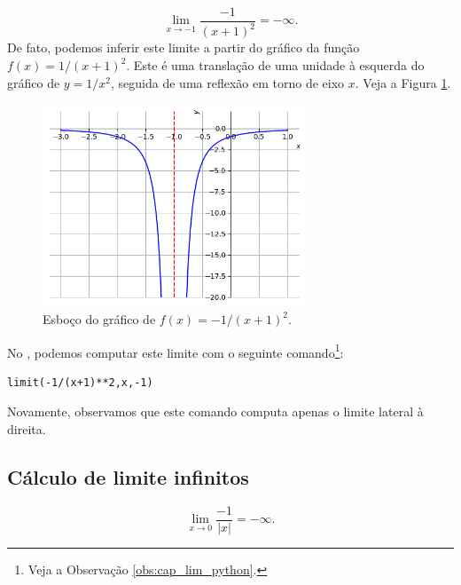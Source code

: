 \begin{ex}
  \begin{equation}
    \lim_{x\to -1} \frac{-1}{(x+1)^2} = -\infty.
  \end{equation}
  De fato, podemos inferir este limite a partir do gráfico da função $f(x) = 1/(x+1)^2$. Este é uma translação de uma unidade à esquerda do gráfico de $y = 1/x^2$, seguida de uma reflexão em torno de eixo $x$. Veja a Figura \ref{fig:ex_liminf-1x2}.

  \begin{figure}[H]
    \centering
    \includegraphics[width=0.7\textwidth]{./cap_lim/dados/fig_ex_liminf-1x2/fig_ex_liminf-1x2}
    \caption{Esboço do gráfico de $f(x)=-1/(x+1)^2$.}
    \label{fig:ex_liminf-1x2}
  \end{figure}

  \ifispython
  No \sympy, podemos computar este limite com o seguinte comando\footnote{Veja a Observação \ref{obs:cap_lim_python}.}:
\begin{verbatim}
limit(-1/(x+1)**2,x,-1)
\end{verbatim}
  Novamente, observamos que este comando computa apenas o limite lateral à direita.
  \fi
\end{ex}

\subsection{Cálculo de limite infinitos}

\emconstrucao

\begin{ex}
  \begin{equation}
    \lim_{x\to 0} \frac{-1}{|x|} = -\infty.
  \end{equation}
\end{ex}


